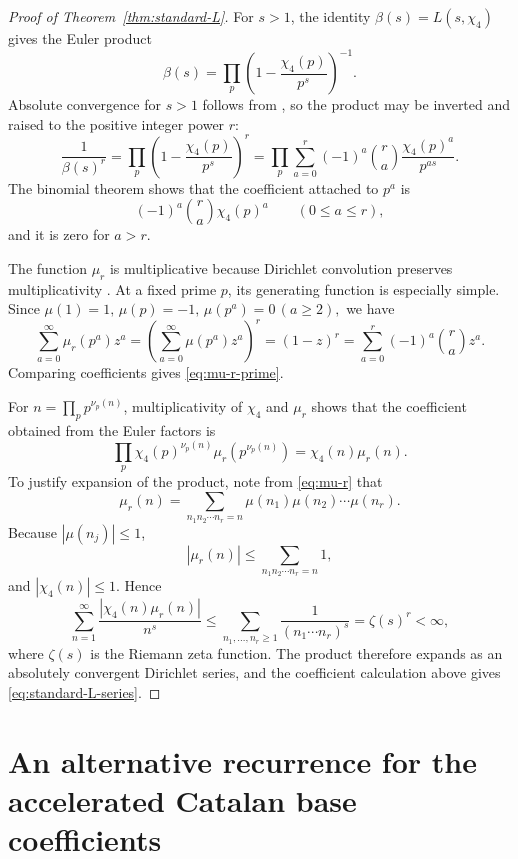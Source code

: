 \documentclass[11pt,reqno]{amsart}
\numberwithin{equation}{section}
\theoremstyle{definition}
\theoremstyle{remark}
\begin{document}
\begin{proof}[Proof of Theorem~\ref{thm:standard-L}]
For \(s>1\), the identity \(\beta(s)=L(s,\chi_4)\) gives the Euler
product
\begin{equation}\label{eq:beta-euler-product}
 \beta(s)
 =\prod_p
  \left(1-\frac{\chi_4(p)}{p^s}\right)^{-1}.
\end{equation}
Absolute convergence for \(s>1\) follows from
\cite[Thm.~11.7]{Apostol1976}, so the product may be inverted and
raised to the positive integer power \(r\):
\[
 \frac1{\beta(s)^r}
 =
 \prod_p
 \left(1-\frac{\chi_4(p)}{p^s}\right)^r
 =
 \prod_p\sum_{a=0}^{r}
 (-1)^a\binom{r}{a}
 \frac{\chi_4(p)^a}{p^{as}}.
\]
The binomial theorem shows that the coefficient attached to \(p^a\)
is
\[
 (-1)^a\binom{r}{a}\chi_4(p)^a
 \qquad(0\leq a\leq r),
\]
and it is zero for \(a>r\).

The function \(\mu_r\) is multiplicative because Dirichlet convolution
preserves multiplicativity \cite[Thm.~2.14]{Apostol1976}.  At a fixed
prime \(p\), its generating function is especially simple.  Since
\(
 \mu(1)=1,\,
 \mu(p)=-1,\,
 \mu(p^a)=0\, (a\geq2),
\)
we have
\[
 \sum_{a=0}^{\infty}\mu_r(p^a)z^a
 =
 \left(
  \sum_{a=0}^{\infty}\mu(p^a)z^a
 \right)^r
 =
 (1-z)^r
 =
 \sum_{a=0}^{r}(-1)^a\binom{r}{a}z^a.
\]
Comparing coefficients gives \eqref{eq:mu-r-prime}.

For \(n=\prod_p p^{\nu_p(n)}\), multiplicativity of \(\chi_4\) and
\(\mu_r\) shows that the coefficient obtained from the Euler factors
is
\[
 \prod_p
 \chi_4(p)^{\nu_p(n)}
 \mu_r\!\left(p^{\nu_p(n)}\right)
 =
 \chi_4(n)\mu_r(n).
\]
To justify expansion of the product, note from \eqref{eq:mu-r} that
\[
 \mu_r(n)
 =
 \sum_{n_1n_2\cdots n_r=n}
 \mu(n_1)\mu(n_2)\cdots\mu(n_r).
\]
Because \(|\mu(n_j)|\leq1\),
\[
 |\mu_r(n)|
 \leq
 \sum_{n_1n_2\cdots n_r=n}1,
\]
and \(|\chi_4(n)|\leq1\).  Hence
\[
 \sum_{n=1}^{\infty}
 \frac{|\chi_4(n)\mu_r(n)|}{n^s}
 \leq
 \sum_{n_1,\ldots,n_r\geq1}
 \frac1{(n_1\cdots n_r)^s}
 =\zeta(s)^r<\infty,
\]
where \(\zeta(s)\) is the Riemann zeta function.
The product therefore expands as an absolutely convergent Dirichlet
series, and the coefficient calculation above gives
\eqref{eq:standard-L-series}.
\end{proof}


\section{An alternative recurrence for the accelerated Catalan base
coefficients}
\label{app:ode}
\end{document}
